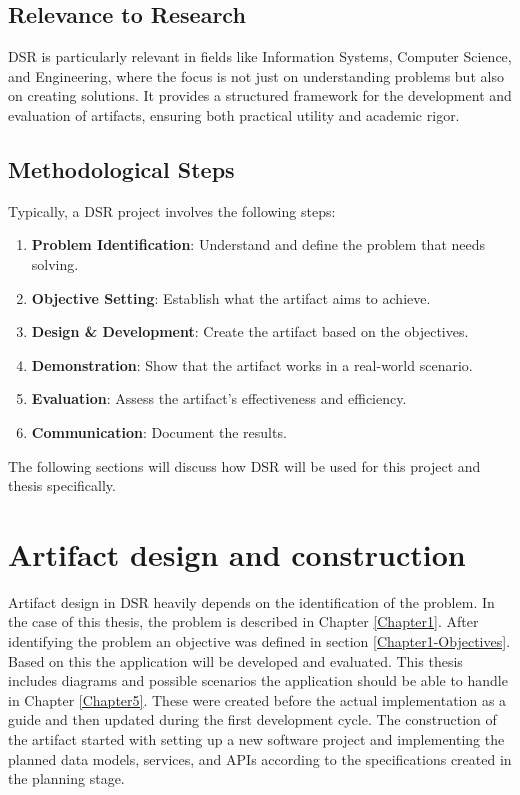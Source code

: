 \subsection{Relevance to Research}

DSR is particularly relevant in fields like Information Systems, 
Computer Science, and Engineering, 
where the focus is not just on understanding problems 
but also on creating solutions. 
It provides a structured framework for the development 
and evaluation of artifacts, ensuring both practical 
utility and academic rigor.

\subsection{Methodological Steps}

Typically, a DSR project involves the following steps:

\begin{enumerate}
    \item \textbf{Problem Identification}: Understand and define the problem that needs solving.
    \item \textbf{Objective Setting}: Establish what the artifact aims to achieve.
    \item \textbf{Design \& Development}: Create the artifact based on the objectives.
    \item \textbf{Demonstration}: Show that the artifact works in a real-world scenario.
    \item \textbf{Evaluation}: Assess the artifact's effectiveness and efficiency.
    \item \textbf{Communication}: Document the results.
\end{enumerate}

The following sections will discuss how DSR will be used for this project and thesis
specifically.

\section{Artifact design and construction}
Artifact design in DSR heavily depends on the identification of the problem.
In the case of this thesis, the problem is described in Chapter \ref{Chapter1}.
After identifying the problem an objective was defined in 
section \ref{Chapter1-Objectives}. 
Based on this the application will be developed and evaluated. 
This thesis includes diagrams and possible scenarios the application should be able to handle in Chapter \ref{Chapter5}. 
These were created before the actual implementation as a guide
and then updated during the first development cycle. 
The construction of the artifact started with setting up a new software project and implementing the planned data models,
services, and APIs according to the specifications created in the planning stage. 

